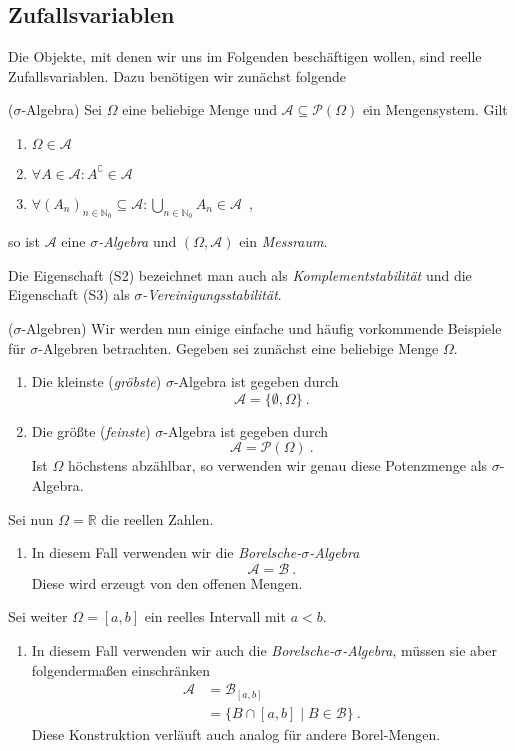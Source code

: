 \subsection{Zufallsvariablen}

Die Objekte, mit denen wir uns im Folgenden beschäftigen wollen, sind reelle Zufallsvariablen. Dazu benötigen wir zunächst folgende

\begin{Definition}{($\sigma$-Algebra)}
\hypertarget{Def:Sigma}{}Sei $\Omega$ eine beliebige Menge und $\mathscr{A} \subseteq \mathcal{P}(\Omega)$ ein Mengensystem. Gilt
\begin{enumerate}[label=\textup{(S\arabic*)}]
\item $\Omega \in \mathscr{A}$
\item $\forall A \in \mathscr{A}: A^\complement \in \mathscr{A}$
\item $\forall (A_n)_{n \in \mathbb{N}_0} \subseteq \mathscr{A}: \bigcup_{n \in \mathbb{N}_0} A_n \in \mathscr{A}$~,
\end{enumerate}
so ist $\mathscr{A}$ eine \textit{$\sigma$-Algebra} und $(\Omega, \mathscr{A})$ ein \textit{Messraum}.
\end{Definition}

Die Eigenschaft (S2) bezeichnet man auch als \textit{Komplementstabilität} und die Eigenschaft (S3) als \textit{$\sigma$-Vereinigungsstabilität}.

\begin{Beispiel}{($\sigma$-Algebren)}
Wir werden nun einige einfache und häufig vorkommende Beispiele für $\sigma$-Algebren betrachten. Gegeben sei zunächst eine beliebige Menge $\Omega$.
\begin{enumerate}[label=(\roman*)]
\item Die kleinste (\textit{gröbste}) $\sigma$-Algebra ist gegeben durch
\[\mathscr{A} = \{ \emptyset, \Omega \}~.\]
\item Die größte (\textit{feinste}) $\sigma$-Algebra ist gegeben durch
\[\mathscr{A} = \mathcal{P}(\Omega)~.\]
Ist $\Omega$ höchstens abzählbar, so verwenden wir genau diese Potenzmenge als $\sigma$-Algebra.
\end{enumerate}
Sei nun $\Omega = \mathbb{R}$ die reellen Zahlen.
\begin{enumerate}[label=(\roman*), resume]
\item In diesem Fall verwenden wir die \textit{Borelsche-$\sigma$-Algebra}
\[\mathscr{A} = \mathscr{B}~.\]
Diese wird erzeugt von den offenen Mengen.
\end{enumerate}
Sei weiter $\Omega = [a, b]$ ein reelles Intervall mit $a < b$.
\begin{enumerate}[label=(\roman*), resume]
\item In diesem Fall verwenden wir auch die \textit{Borelsche-$\sigma$-Algebra}, müssen sie aber folgendermaßen einschränken
\begin{align*}
\mathscr{A} &= \mathscr{B}_{[a, b]}\\
&= \{ B \cap [a, b] \mid B \in \mathscr{B} \}~.
\end{align*}
Diese Konstruktion verläuft auch analog für andere Borel-Mengen.
\end{enumerate}
\end{Beispiel}

